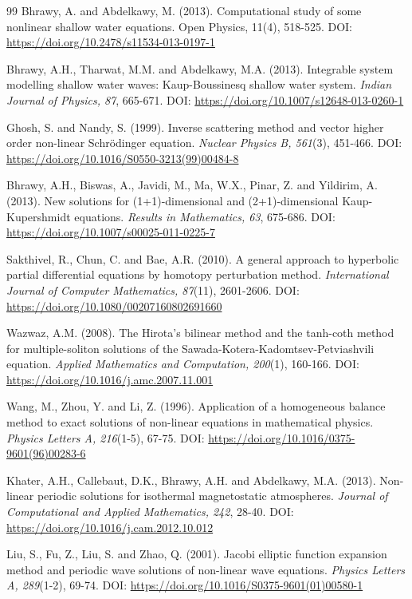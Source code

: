 \documentclass[10pt]{NSP1}
\numberwithin{equation}{section}
\begin{document}
\begin{thebibliography}{99}
 Bhrawy, A. and Abdelkawy, M. (2013). Computational study of some nonlinear shallow water equations. Open Physics, 11(4), 518-525. DOI: \url{https://doi.org/10.2478/s11534-013-0197-1}

 Bhrawy, A.H., Tharwat, M.M. and Abdelkawy, M.A. (2013). Integrable system modelling shallow water waves: Kaup-Boussinesq shallow water system. \emph{Indian Journal of Physics, 87}, 665-671. DOI: \url{https://doi.org/10.1007/s12648-013-0260-1}

 Ghosh, S. and Nandy, S. (1999). Inverse scattering method and vector higher order non-linear Schr\"odinger equation. \emph{Nuclear Physics B, 561}(3), 451-466. DOI: \url{https://doi.org/10.1016/S0550-3213(99)00484-8}

 Bhrawy, A.H., Biswas, A., Javidi, M., Ma, W.X., Pinar, Z. and Yildirim, A. (2013). New solutions for (1+1)-dimensional and (2+1)-dimensional Kaup-Kupershmidt equations. \emph{Results in Mathematics, 63}, 675-686. DOI: \url{https://doi.org/10.1007/s00025-011-0225-7}

 Sakthivel, R., Chun, C. and Bae, A.R. (2010). A general approach to hyperbolic partial differential equations by homotopy perturbation method. \emph{International Journal of Computer Mathematics, 87}(11), 2601-2606. DOI: \url{https://doi.org/10.1080/00207160802691660}

 Wazwaz, A.M. (2008). The Hirota's bilinear method and the tanh-coth method for multiple-soliton solutions of the Sawada-Kotera-Kadomtsev-Petviashvili equation. \emph{Applied Mathematics and Computation, 200}(1), 160-166. DOI: \url{https://doi.org/10.1016/j.amc.2007.11.001}

 Wang, M., Zhou, Y. and Li, Z. (1996). Application of a homogeneous balance method to exact solutions of non-linear equations in mathematical physics. \emph{Physics Letters A, 216}(1-5), 67-75. DOI: \url{https://doi.org/10.1016/0375-9601(96)00283-6}

 Khater, A.H., Callebaut, D.K., Bhrawy, A.H. and Abdelkawy, M.A. (2013). Non-linear periodic solutions for isothermal magnetostatic atmospheres. \emph{Journal of Computational and Applied Mathematics, 242}, 28-40. DOI: \url{https://doi.org/10.1016/j.cam.2012.10.012}

 Liu, S., Fu, Z., Liu, S. and Zhao, Q. (2001). Jacobi elliptic function expansion method and periodic wave solutions of non-linear wave equations. \emph{Physics Letters A, 289}(1-2), 69-74. DOI: \url{https://doi.org/10.1016/S0375-9601(01)00580-1}


\end{thebibliography}
\end{document}
